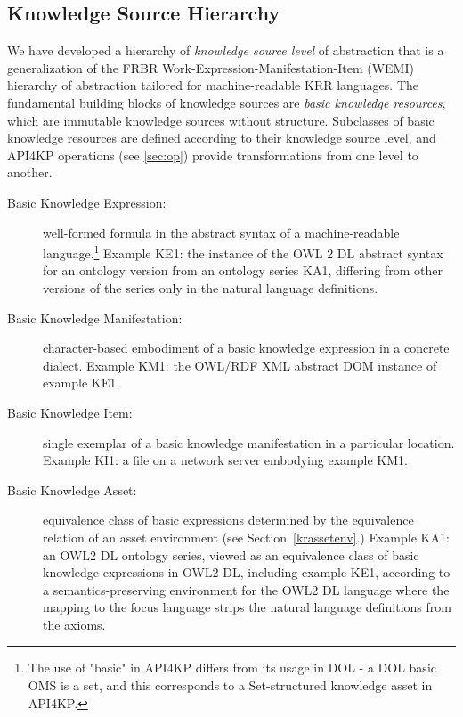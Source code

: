 \documentclass[runningheads]{llncs}
\begin{document}

\subsection{Knowledge Source Hierarchy}
We have developed a hierarchy of \emph{knowledge source level} of abstraction that is a generalization of the FRBR \cite{FRBR} Work-Expression-Manifestation-Item (WEMI) hierarchy of abstraction tailored for machine-readable KRR languages. The fundamental building blocks of knowledge sources are \emph{basic knowledge resources}, which are immutable knowledge sources without structure.
Subclasses of basic knowledge resources are defined according to their knowledge source level, and API4KP operations (see \ref{sec:op}) provide transformations from one level to another.
\begin{description}
\item[Basic Knowledge Expression:] well-formed formula in the abstract syntax of a machine-readable language.\footnote{The use of "basic" in API4KP differs from its usage in DOL\cite{DOL} - a DOL basic OMS is a set, and this corresponds to a Set-structured knowledge asset in API4KP.}
Example KE1: the instance of the OWL 2 DL abstract syntax for an ontology version from an ontology series KA1, differing from other versions of the series only in the natural language definitions.
\item[Basic Knowledge Manifestation:] character-based embodiment of a basic knowledge expression in a concrete dialect. Example KM1: the OWL/RDF XML abstract DOM instance of example KE1.
\item[Basic Knowledge Item:] single exemplar of a basic knowledge manifestation in a particular location. Example KI1: a file on a network server embodying example KM1.
\item[Basic Knowledge Asset:] equivalence class of basic expressions determined by the equivalence relation of an asset environment (see Section~\ref{krassetenv}.) Example KA1: an OWL2 DL ontology series, viewed as an equivalence class of basic knowledge expressions in OWL2 DL, including example KE1, according to a semantics-preserving environment for the OWL2 DL language where the mapping to the focus language strips the natural language definitions from the axioms.
\end{description}
\end{document}
